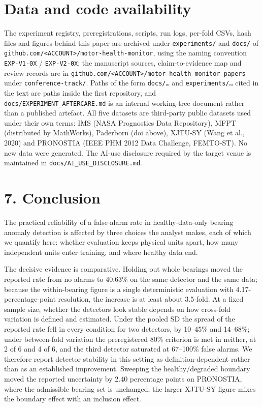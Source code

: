 \documentclass[11pt]{article}
\newcommand{\code}[1]{\texttt{#1}}
\begin{document}
\section{Data and code availability}

The experiment registry, preregistrations, scripts, run logs, per-fold CSVs, hash files and figures behind this paper are archived under \code{experiments/} and \code{docs/} of \code{github.com/<ACCOUNT>/motor-health-monitor}, using the naming convention \code{EXP-V1-0X} / \code{EXP-V2-0X}; the manuscript sources, claim-to-evidence map and review records are in \code{github.com/<ACCOUNT>/motor-health-monitor-papers} under \code{conference-track/}. Paths of the form \code{docs/…} and \code{experiments/…} cited in the text are paths inside the first repository, and \code{docs/EXPERIMENT\_AFTERCARE.md} is an internal working-tree document rather than a published artefact. All five datasets are third-party public datasets used under their own terms: IMS (NASA Prognostics Data Repository), MFPT (distributed by MathWorks), Paderborn (doi above), XJTU-SY (Wang et al., 2020) and PRONOSTIA (IEEE PHM 2012 Data Challenge, FEMTO-ST). No new data were generated. The AI-use disclosure required by the target venue is maintained in \code{docs/AI\_USE\_DISCLOSURE.md}.



\section{7. Conclusion}

The practical reliability of a false-alarm rate in healthy-data-only bearing anomaly detection is affected by three choices the analyst makes, each of which we quantify here: whether evaluation keeps physical units apart, how many independent units enter training, and where healthy data end.

The decisive evidence is comparative. Holding out whole bearings moved the reported rate from no alarms to 40.63\% on the same detector and the same data; because the within-bearing figure is a single deterministic evaluation with 4.17-percentage-point resolution, the increase is at least about 3.5-fold. At a fixed sample size, whether the detectors look stable depends on how cross-fold variation is defined and estimated. Under the pooled SD the spread of the reported rate fell in every condition for two detectors, by 10--45\% and 14--68\%; under between-fold variation the preregistered 80\% criterion is met in neither, at 2 of 6 and 4 of 6, and the third detector saturated at 67--100\% false alarms. We therefore report detector stability in this setting as definition-dependent rather than as an established improvement. Sweeping the healthy/degraded boundary moved the reported uncertainty by 2.40 percentage points on PRONOSTIA, where the admissible bearing set is unchanged; the larger XJTU-SY figure mixes the boundary effect with an inclusion effect.
\end{document}
